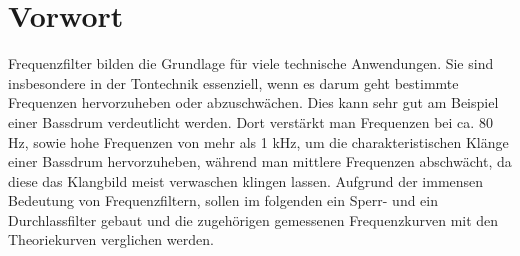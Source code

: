 \section{Vorwort}
Frequenzfilter bilden die Grundlage für viele technische Anwendungen. Sie sind insbesondere in der Tontechnik essenziell, wenn es darum geht bestimmte Frequenzen hervorzuheben oder abzuschwächen. Dies kann sehr gut am Beispiel einer Bassdrum verdeutlicht werden. Dort verstärkt man Frequenzen bei ca. 80 Hz, sowie hohe Frequenzen von mehr als 1 kHz, um die charakteristischen Klänge einer Bassdrum hervorzuheben, während man mittlere Frequenzen abschwächt, da diese das Klangbild meist verwaschen klingen lassen. Aufgrund der immensen Bedeutung von Frequenzfiltern, sollen im folgenden ein Sperr- und ein Durchlassfilter gebaut und die zugehörigen gemessenen Frequenzkurven mit den Theoriekurven verglichen werden.

